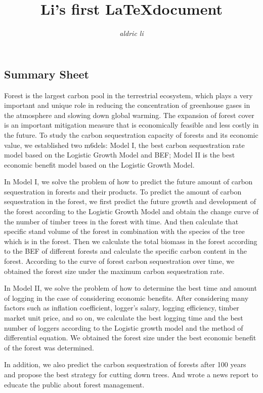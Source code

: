 \documentclass{article}
\title{Li's first \LaTeX\enspace document}
\author{\emph{aldric li}}
\begin{document}
\maketitle
{\subsection*{Summary Sheet}}
{\large 	Forest is the largest carbon pool in the terrestrial ecosystem, which plays a very important and unique role
    in reducing the concentration of greenhouse gases in the atmosphere and slowing down global warming.
    The expansion of forest cover is an important mitigation measure that is economically feasible and less costly in the future.
    To study the carbon sequestration capacity of forests and its economic value,
    we established two m6dels: Model I, the best carbon sequestration rate model based on the Logistic Growth Model and BEF;
    Model II is the best economic benefit model based on the Logistic Growth Model.

    In Model I, we solve the problem of how to predict the future amount of carbon
    sequestration in forests and their products. To predict the amount of carbon
    sequestration in the forest, we first predict the future growth and development
    of the forest according to the Logistic Growth Model and obtain the change
    curve of the number of timber trees in the forest with time. And then calculate
    that specific stand volume of the forest in combination with the species of the
    tree which is in the forest. Then we calculate the total biomass in the forest
    according to the BEF of different forests and calculate the specific carbon
    content in the forest. According to the curve of forest carbon sequestration
    over time, we obtained the forest size under the maximum carbon sequestration
    rate.

    In Model II, we solve the problem of how to determine the best time and amount
    of logging in the case of considering economic benefits. After considering many
    factors such as inflation coefficient, logger's salary, logging efficiency,
    timber market unit price, and so on, we calculate the best logging time and the
    best number of loggers according to the Logistic growth model and the method of
    differential equation. We obtained the forest size under the best economic
    benefit of the forest was determined.

    In addition, we also predict the carbon sequestration of forests after 100
    years and propose the best strategy for cutting down trees. And wrote a news
    report to educate the public about forest management.}
\end{document}
